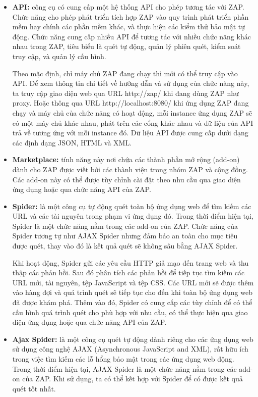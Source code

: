 \begin{itemize}
  \item \textbf{API:} công cụ có cung cấp một hệ thống API cho phép tương tác với ZAP.
  Chức năng cho phép phát triển tích hợp ZAP vào quy trình phát triển phần mềm hay chính các phần mềm khác, và thực hiện các kiểm thử bảo mật tự động.
  Chức năng cung cấp nhiều API để tương tác với nhiều chức năng khác nhau trong ZAP, tiêu biểu là quét tự động, quản lý phiên quét, kiểm soát truy cập, và quản lý cấu hình.
  \par
  Theo mặc định, chỉ máy chủ ZAP đang chạy thì mới có thể truy cập vào API.
  Để xem thông tin chi tiết về hướng dẫn và sử dụng của chức năng này, ta truy cập giao diện web qua URL http://zap/ khi đang dùng ZAP như proxy.
  Hoặc thông qua URL http://localhost:8080/ khi ứng dụng ZAP đang chạy và máy chủ của chức năng có hoạt động, mỗi instance ứng dụng ZAP sẽ có một máy chủ khác nhau, phát trên các cổng khác nhau và dữ liệu của API trả về tương ứng với mỗi instance đó.
  Dữ liệu API được cung cấp dưới dạng các định dạng JSON, HTML và XML.
  \item \textbf{Marketplace:} tính năng này nơi chứa các thành phần mở rộng (add-on) dành cho ZAP được viết bởi các thành viện trong nhóm ZAP và cộng đồng. Các add-on này có thể được tùy chỉnh cài đặt theo nhu cầu qua giao diện ứng dụng hoặc qua chức năng API của ZAP.
  \item \textbf{Spider:} là một công cụ tự động quét toàn bộ ứng dụng web để tìm kiếm các URL và các tài nguyên trong phạm vi ứng dụng đó. Trong thời điểm hiện tại, Spider là một chức năng nằm trong các add-on của ZAP. Chức năng của Spider tương tự như AJAX Spider nhưng đảm bảo an toàn cho mục tiêu được quét, thay vào đó là kết quả quét sẽ không sâu bằng AJAX Spider. 
  \par
  Khi hoạt động, Spider gửi các yêu cầu HTTP giả mạo đến trang web và thu thập các phản hồi. Sau đó phân tích các phản hồi để tiếp tục tìm kiếm các URL mới, tài nguyên, tệp JavaScript và tệp CSS. Các URL mới sẽ được thêm vào hàng đợi và quá trình quét sẽ tiếp tục cho đến khi toàn bộ ứng dụng web đã được khám phá. Thêm vào đó, Spider có cung cấp các tùy chỉnh để có thể cấu hình quá trình quét cho phù hợp với nhu cầu, có thể thực hiện qua giao diện ứng dụng hoặc qua chức năng API của ZAP.
  \item \textbf{Ajax Spider:} là một công cụ quét tự động dành riêng cho các ứng dụng web sử dụng công nghệ AJAX (Asynchronous JavaScript and XML), rất hữu ích trong việc tìm kiếm các lỗ hổng bảo mật trong các ứng dụng web động. Trong thời điểm hiện tại, AJAX Spider là một chức năng nằm trong các add-on của ZAP. Khi sử dụng, ta có thể kết hợp với Spider để có được kết quả quét tốt nhất.

\end{itemize}
